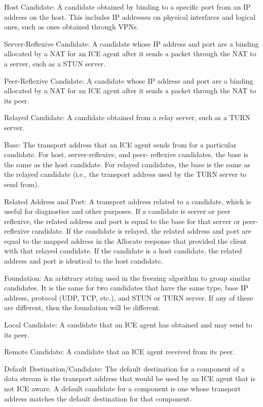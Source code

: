 \documentclass{article}
\begin{document}
Host Candidate:  A candidate obtained by binding to a specific port from an IP address on the host.  This includes IP addresses on physical interfaces and logical ones, such as ones obtained through VPNs.

Server-Reflexive Candidate:  A candidate whose IP address and port are a binding allocated by a NAT for an ICE agent after it sends a packet through the NAT to a server, such as a STUN server.

Peer-Reflexive Candidate:  A candidate whose IP address and port are a binding allocated by a NAT for an ICE agent after it sends a packet through the NAT to its peer.

Relayed Candidate:  A candidate obtained from a relay server, such as a TURN server.

Base:  The transport address that an ICE agent sends from for a particular candidate.  For host, server-reflexive, and peer- reflexive candidates, the base is the same as the host candidate. For relayed candidates, the base is the same as the relayed candidate (i.e., the transport address used by the TURN server to send from).

Related Address and Port:  A transport address related to a candidate, which is useful for diagnostics and other purposes.  If a candidate is server or peer reflexive, the related address and port is equal to the base for that server or peer-reflexive candidate.  If the candidate is relayed, the related address and port are equal to the mapped address in the Allocate response that provided the client with that relayed candidate.  If the candidate is a host candidate, the related address and port is identical to the host candidate.

Foundation:  An arbitrary string used in the freezing algorithm to group similar candidates.  It is the same for two candidates that have the same type, base IP address, protocol (UDP, TCP, etc.), and STUN or TURN server.  If any of these are different, then the foundation will be different.

Local Candidate:  A candidate that an ICE agent has obtained and may send to its peer.

Remote Candidate:  A candidate that an ICE agent received from its peer.

Default Destination/Candidate:  The default destination for a component of a data stream is the transport address that would be used by an ICE agent that is not ICE aware.  A default candidate for a component is one whose transport address matches the default destination for that component.
\end{document}
